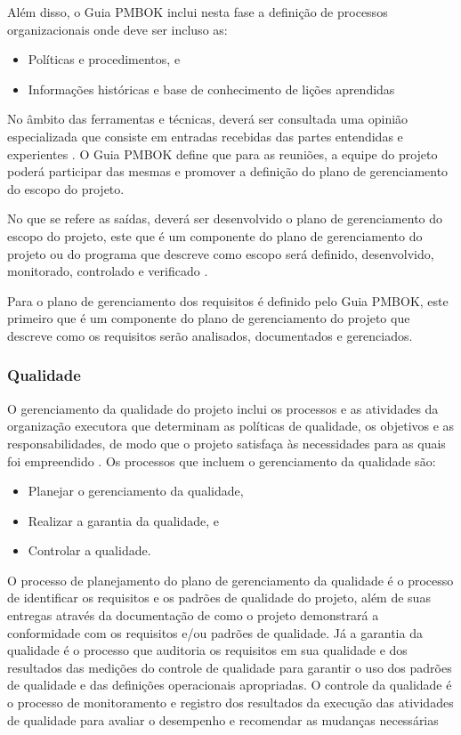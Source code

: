 \documentclass{acm_proc_article-sp}
\begin{document}
Além disso, o  Guia PMBOK inclui nesta fase a definição de processos organizacionais onde deve ser incluso as:

\begin{itemize}
\item Políticas e procedimentos, e
\item Informações históricas e base de conhecimento de lições aprendidas
\end{itemize}

No âmbito das ferramentas e técnicas, deverá ser consultada uma opinião especializada que consiste em entradas recebidas das partes entendidas e experientes \cite{pmbok:nAgil}. O Guia PMBOK define que para as reuniões, a equipe do projeto poderá participar das mesmas e promover a definição do plano de gerenciamento do escopo do projeto.

No que se refere as saídas, deverá ser desenvolvido o plano de gerenciamento do escopo do projeto, este que é um componente do plano de gerenciamento do projeto ou do programa que descreve como escopo será definido, desenvolvido, monitorado, controlado e verificado \cite{pmbok:nAgil}.

Para o plano de gerenciamento dos requisitos é definido pelo Guia PMBOK, este primeiro que é um componente do plano de gerenciamento do projeto que descreve como os requisitos serão analisados, documentados e gerenciados. 
\subsubsection*{Qualidade}
O gerenciamento da qualidade do projeto inclui os processos e as atividades da organização executora que determinam as políticas de qualidade, os objetivos e as responsabilidades, de modo que o projeto satisfaça às necessidades para as quais foi empreendido  \cite{pmbok:nAgil}. Os processos que incluem o gerenciamento da qualidade são:

\begin{itemize}
\item Planejar o gerenciamento da qualidade,
\item Realizar a garantia da qualidade, e
\item Controlar a qualidade.
\end{itemize}

O processo de planejamento do plano de gerenciamento da qualidade é o processo de identificar os requisitos e os padrões de qualidade do projeto, além de suas entregas através da documentação de como o projeto demonstrará a conformidade com os requisitos e/ou padrões de qualidade. Já a garantia da qualidade é o processo que auditoria os requisitos em sua qualidade e dos resultados das medições do controle de qualidade para garantir o uso dos padrões de qualidade e das definições operacionais apropriadas. O controle da qualidade é o processo de monitoramento e registro dos resultados da execução das atividades de qualidade para avaliar o desempenho e recomendar as mudanças necessárias \cite{pmbok:nAgil}
\end{document}
